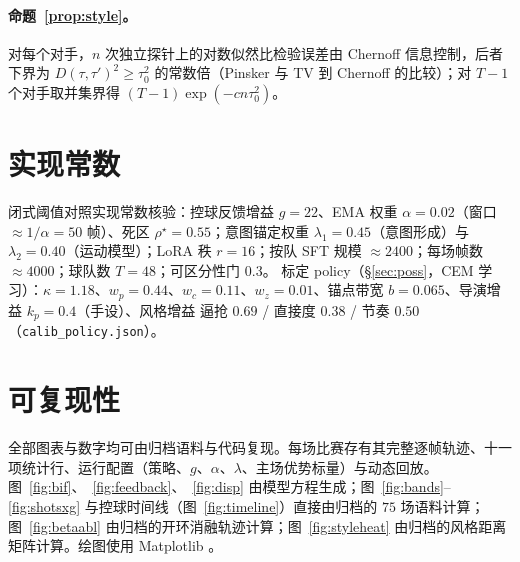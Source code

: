 \documentclass[11pt,UTF8,fontset=fandol]{ctexart}
\theoremstyle{plain}
\theoremstyle{definition}
\theoremstyle{remark}
\begin{document}
\paragraph{命题~\ref{prop:style}。} 对每个对手，$n$ 次独立探针上的对数似然比检验误差由 Chernoff 信息控制，后者下界为 $D(\tau,\tau')^2\ge\tau_0^2$ 的常数倍（Pinsker 与 TV 到 Chernoff 的比较）；对 $T-1$ 个对手取并集界得 $(T-1)\exp(-cn\tau_0^2)$。

\section{实现常数}\label{app:consts}
闭式阈值对照实现常数核验：控球反馈增益 $g=22$、EMA 权重 $\alpha=0.02$（窗口 $\approx1/\alpha=50$ 帧）、死区 $\rho^\star=0.55$；意图锚定权重 $\lambda_1=0.45$（意图形成）与 $\lambda_2=0.40$（运动模型）；LoRA 秩 $r=16$；按队 SFT 规模 $\approx2400$；每场帧数 $\approx4000$；球队数 $T=48$；可区分性门 $0.3$。 标定 policy（\S\ref{sec:poss}，CEM 学习）：$\kappa=1.18$、$w_p=0.44$、$w_c=0.11$、$w_z=0.01$、锚点带宽 $b=0.065$、导演增益 $k_p=0.4$（手设）、风格增益 逼抢 $0.69$ / 直接度 $0.38$ / 节奏 $0.50$（\texttt{calib\_policy.json}）。

\section{可复现性}\label{app:repro}
全部图表与数字均可由归档语料与代码复现。每场比赛存有其完整逐帧轨迹、十一项统计行、运行配置（策略、$g$、$\alpha$、$\lambda$、主场优势标量）与动态回放。图~\ref{fig:bif}、~\ref{fig:feedback}、~\ref{fig:disp} 由模型方程生成；图~\ref{fig:bands}--\ref{fig:shotsxg} 与控球时间线（图~\ref{fig:timeline}）直接由归档的 $75$ 场语料计算；图~\ref{fig:betaabl} 由归档的开环消融轨迹计算；图~\ref{fig:styleheat} 由归档的风格距离矩阵计算。绘图使用 Matplotlib \citep{hunter2007}。
\end{document}
